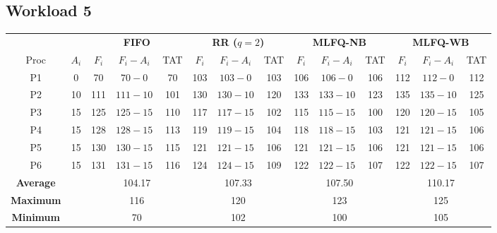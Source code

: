 \documentclass[11pt,a4paper]{article}
\begin{document}
\subsection{Workload 5}
\begin{center}\footnotesize\setlength{\tabcolsep}{4pt}
\begin{tabular}{cccccccccccccc}\toprule
& & \multicolumn{3}{c}{\textbf{FIFO}} & \multicolumn{3}{c}{\textbf{RR ($q=2$)}} & \multicolumn{3}{c}{\textbf{MLFQ-NB}} & \multicolumn{3}{c}{\textbf{MLFQ-WB}} \\
\cmidrule(lr){3-5}\cmidrule(lr){6-8}\cmidrule(lr){9-11}\cmidrule(lr){12-14}
Proc & $A_i$ & $F_i$ & $F_i-A_i$ & TAT & $F_i$ & $F_i-A_i$ & TAT & $F_i$ & $F_i-A_i$ & TAT & $F_i$ & $F_i-A_i$ & TAT \\\midrule
P1 & 0 & 70 & $70-0$ & 70 & 103 & $103-0$ & 103 & 106 & $106-0$ & 106 & 112 & $112-0$ & 112 \\
P2 & 10 & 111 & $111-10$ & 101 & 130 & $130-10$ & 120 & 133 & $133-10$ & 123 & 135 & $135-10$ & 125 \\
P3 & 15 & 125 & $125-15$ & 110 & 117 & $117-15$ & 102 & 115 & $115-15$ & 100 & 120 & $120-15$ & 105 \\
P4 & 15 & 128 & $128-15$ & 113 & 119 & $119-15$ & 104 & 118 & $118-15$ & 103 & 121 & $121-15$ & 106 \\
P5 & 15 & 130 & $130-15$ & 115 & 121 & $121-15$ & 106 & 121 & $121-15$ & 106 & 121 & $121-15$ & 106 \\
P6 & 15 & 131 & $131-15$ & 116 & 124 & $124-15$ & 109 & 122 & $122-15$ & 107 & 122 & $122-15$ & 107 \\
\midrule
\textbf{Average} & & \multicolumn{3}{c}{104.17} & \multicolumn{3}{c}{107.33} & \multicolumn{3}{c}{107.50} & \multicolumn{3}{c}{110.17} \\
\textbf{Maximum} & & \multicolumn{3}{c}{116} & \multicolumn{3}{c}{120} & \multicolumn{3}{c}{123} & \multicolumn{3}{c}{125} \\
\textbf{Minimum} & & \multicolumn{3}{c}{70} & \multicolumn{3}{c}{102} & \multicolumn{3}{c}{100} & \multicolumn{3}{c}{105} \\
\bottomrule\end{tabular}\end{center}
\end{document}
